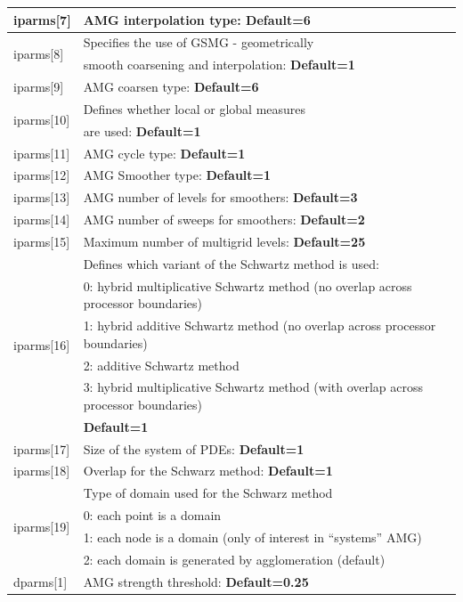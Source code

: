 \documentclass[a4paper,twoside,12pt]{book}
\begin{document}
\begin{table}[hbtp]
 \begin{tabular}{|l|l|} \hline
iparms[7] & AMG interpolation type: \textbf{Default=6} \\ \hline
\multirow{2}{*}{iparms[8]} &  Specifies the use of GSMG - geometrically \\
& smooth coarsening and interpolation: \textbf{Default=1} \\ \hline
iparms[9] & AMG coarsen type: \textbf{Default=6} \\  \hline
\multirow{2}{*}{iparms[10]} & Defines whether local or global measures \\
& are used: \textbf{Default=1}\\ \hline
iparms[11]& AMG cycle type:\textbf{ Default=1}\\ \hline
iparms[12]& AMG Smoother  type: \textbf{Default=1}\\ \hline
iparms[13]& AMG number of levels for smoothers: \textbf{Default=3}\\ \hline
iparms[14]& AMG number of sweeps for smoothers: \textbf{Default=2}\\ \hline
iparms[15]& Maximum number of multigrid levels:\textbf{ Default=25}\\ \hline
\multirow{6}{*}{iparms[16]}& Defines which variant of the Schwartz method is
used:\\
& 0: hybrid multiplicative Schwartz method (no overlap across processor
boundaries)\\
& 1: hybrid additive Schwartz method (no overlap across processor boundaries)\\
& 2: additive Schwartz method\\
& 3: hybrid multiplicative Schwartz method (with overlap across processor
boundaries)\\
& \textbf{ Default=1}\\ \hline
iparms[17]& Size of the system of PDEs: \textbf{ Default=1}\\ \hline
iparms[18]& Overlap for the Schwarz method: \textbf{ Default=1}\\ \hline
\multirow{4}{*}{iparms[19]} & Type of domain used for the Schwarz method\\
& 0: each point is a domain \\
& 1: each node is a domain (only of interest in ``systems'' AMG)\\
& 2: each domain is generated by agglomeration (default) \\ \hline
dparms[1]& AMG strength threshold: \textbf{ Default=0.25}\\ \hline

\end{tabular}
\end{table}
\end{document}
